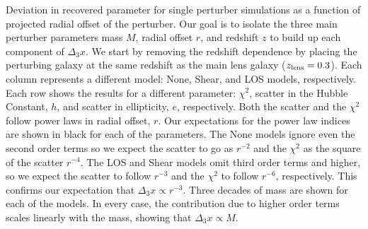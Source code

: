 \label{fig:toyr3} Deviation in recovered parameter for single perturber simulations as a function of projected radial offset of the perturber. Our goal is to isolate the three main perturber parameters mass $M$, radial offset $r$, and redshift $z$ to build up each component of $\Delta_3 x$. We start by removing the redshift dependence by placing the perturbing galaxy at the same redshift as the main lens galaxy ($z_{\rm{lens}} = 0.3$). Each column represents a different model: None, Shear, and LOS models, respectively. Each row shows the results for a different parameter: $\chi^2$, scatter in the Hubble Constant, $h$, and scatter in ellipticity, $e$, respectively. Both the scatter and the $\chi^2$ follow power laws in radial offset, $r$. Our expectations for the power law indices are shown in black for each of the parameters. The None models ignore even the second order terms so we expect the scatter to go as $r^{-2}$ and the $\chi^2$ as the square of the scatter $r^{-4}$. The LOS and Shear models omit third order terms and higher, so we expect the scatter to follow $r^{-3}$ and the $\chi^2$ to follow $r^{-6}$, respectively. This confirms our expectation that $\Delta_3 x \propto r^{-3}$. Three decades of mass are shown for each of the models. In every case, the contribution due to higher order terms scales linearly with the mass, showing that $\Delta_3 x \propto M$.